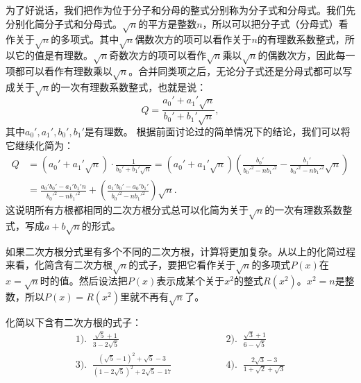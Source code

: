 \documentclass[12pt,UTF8]{ctexbook}
\begin{document}
为了好说话，我们把作为位于分子和分母的整式分别称为分子式和分母式。我们先分别化简分子式和分母式。$\sqrt{n}$的平方是整数$n$，所以可以把分子式（分母式）看作关于$\sqrt{n}$的多项式。其中$\sqrt{n}$偶数次方的项可以看作关于$n$的有理数系数整式，所以它的值是有理数。$\sqrt{n}$奇数次方的项可以看作$\sqrt{n}$乘以$\sqrt{n}$的偶数次方，因此每一项都可以看作有理数乘以$\sqrt{n}$。合并同类项之后，无论分子式还是分母式都可以写成关于$\sqrt{n}$的一次有理数系数整式，也就是说：
$$ Q =  \frac{a_0' + a_1'\sqrt{n}}{b_0' + b_1'\sqrt{n}}, $$
其中$a_0', a_1', b_0' , b_1'$是有理数。
根据前面讨论过的简单情况下的结论，我们可以将它继续化简为：
\begin{align*}
    Q &=  (a_0' + a_1'\sqrt{n})\cdot \frac{1}{b_0' + b_1'\sqrt{n}} = (a_0' + a_1'\sqrt{n}) \left(\frac{b_0'}{b_0'^2 - nb_1'^2} - \frac{b_1'}{b_0'^2 - nb_1'^2}\sqrt{n}\right) \\
    &= \frac{a_0'b_0' - a_1'b_1'n}{b_0'^2 - nb_1'^2} + \left(\frac{a_1'b_0' - a_0'b_1'}{b_0'^2 - nb_1'^2}\right)\sqrt{n}.
\end{align*}
这说明所有方根都相同的二次方根分式总可以化简为关于$\sqrt{n}$的一次有理数系数整式，写成$a + b\sqrt{n}$的形式。

如果二次方根分式里有多个不同的二次方根，计算将更加复杂。从以上的化简过程来看，化简含有二次方根$\sqrt{n}$的式子，要把它看作关于$\sqrt{n}$的多项式$P(x)$在$x = \sqrt{n}$时的值。然后设法把$P(x)$表示成某个关于$x^2$的整式$R(x^2)$。$x^2 = n$是整数，所以$P(x) = R(x^2)$里就不再有$\sqrt{n}$了。

\begin{et}
    化简以下含有二次方根的式子：\\
    $$
    \begin{array}{lll}
       1).\;\; \displaystyle \frac{\sqrt{5} + 1}{3 - 2\sqrt{5}} &  \phantom{00000000} & 2).\;\; \displaystyle \frac{\sqrt{3} + 1}{6 - \sqrt{5}} \\[2em]
       3).\;\; \displaystyle \frac{(\sqrt{5} - 1)^2 + \sqrt{5} - 3}{(1 - 2\sqrt{5})^2 + 2\sqrt{5} - 17} &  \phantom{00000000} & 4).\;\; \displaystyle \frac{2\sqrt{3} - 3}{1 + \sqrt{2} + \sqrt{3}}
    \end{array}
    $$
\end{et}
\end{document}
